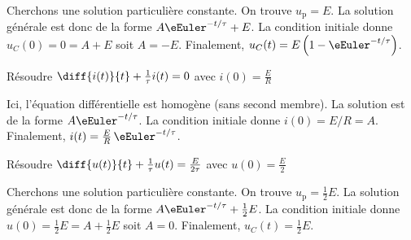 
\begin{corrige}
Cherchons une solution particulière constante. On trouve $u_\text{p}=E$. La solution générale est donc de la forme $A\eEuler^{-t/\tau}+E$. La condition initiale donne $u_C(0)=0=A+E$ soit $A=-E$. Finalement, $u_C(t)=E\left(1-\eEuler^{-t/\tau} \right)$.
\end{corrige}



\begin{enonce}
Résoudre $\diff{i(t)}{t} + \frac{1}{\tau} i(t) = 0$ \quad avec $i(0)=\frac{E}{R}$
\end{enonce}


\begin{corrige}
Ici, l'équation différentielle est homogène (sans second membre). La solution est de la forme  $A\eEuler^{-t/\tau}$. La condition initiale donne $i(0)=E/R=A$. Finalement, $i(t)=\frac{E}{R}\,\eEuler^{-t/\tau}$.
\end{corrige}




\begin{enonce}
Résoudre $\diff{u(t)}{t} + \frac{1}{\tau} u(t) = \frac{E}{2\tau}$ \quad avec $u(0)=\frac{E}{2}$
\end{enonce}


\begin{corrigeNewpage}
Cherchons une solution particulière constante. On trouve $u_\text{p}=\frac12 E$. La solution générale est donc de la forme $A\eEuler^{-t/\tau}+\frac12 E$. La condition initiale donne $u(0)=\frac12 E=A+\frac12 E$ soit $A=0$. Finalement, $u_C(t)=\frac12E$.
\end{corrigeNewpage}


\finEntrainement



